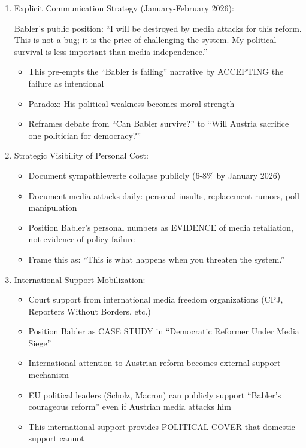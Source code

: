 \begin{enumerate}
\item Explicit Communication Strategy (January-February 2026):

  Babler's public position: ``I will be destroyed by media attacks for this reform. This is not a bug;
  it is the price of challenging the system. My political survival is less important than media independence.''

  \begin{itemize}
  \item This pre-empts the ``Babler is failing'' narrative by ACCEPTING the failure as intentional
  \item Paradox: His political weakness becomes moral strength
  \item Reframes debate from ``Can Babler survive?'' to ``Will Austria sacrifice one politician for democracy?''
  \end{itemize}

\item Strategic Visibility of Personal Cost:

  \begin{itemize}
  \item Document sympathiewerte collapse publicly (6-8\% by January 2026)
  \item Document media attacks daily: personal insults, replacement rumors, poll manipulation
  \item Position Babler's personal numbers as EVIDENCE of media retaliation, not evidence of policy failure
  \item Frame this as: ``This is what happens when you threaten the system.''
  \end{itemize}

\item International Support Mobilization:

  \begin{itemize}
  \item Court support from international media freedom organizations (CPJ, Reporters Without Borders, etc.)
  \item Position Babler as CASE STUDY in ``Democratic Reformer Under Media Siege''
  \item International attention to Austrian reform becomes external support mechanism
  \item EU political leaders (Scholz, Macron) can publicly support ``Babler's courageous reform'' even if
    Austrian media attacks him
  \item This international support provides POLITICAL COVER that domestic support cannot
  \end{itemize}


\end{enumerate}
